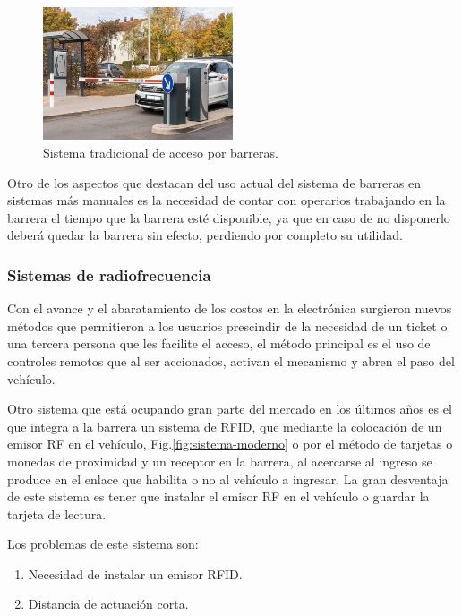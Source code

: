 \begin{figure}
    \centering
    \includegraphics[width=0.5\textwidth]{imgs/sistema-control-acceso-barreras.jpg}
    \caption{Sistema tradicional de acceso por barreras.}
    \label{fig:sistema-tradicional}
\end{figure}

Otro de los aspectos que destacan del uso actual del sistema de barreras en sistemas más manuales es la necesidad de
contar con  operarios trabajando en la barrera el tiempo que la barrera esté disponible, ya que en caso de no disponerlo
deberá quedar la barrera sin efecto, perdiendo por completo su utilidad.

\subsubsection*{Sistemas de radiofrecuencia}

Con el avance y el abaratamiento de los costos en la electrónica surgieron nuevos métodos que permitieron a los usuarios prescindir de la necesidad de un ticket o una tercera persona que les facilite el acceso, el método principal es el uso de controles remotos que al ser accionados, activan el mecanismo y abren el paso del vehículo.

Otro sistema que está ocupando gran parte del mercado en los últimos años es el que integra a la barrera un sistema de RFID, que mediante la colocación de un emisor RF en el vehículo, Fig.\ref{fig:sistema-moderno} o por el método de tarjetas o monedas de proximidad y un receptor en la barrera, al acercarse al ingreso se produce en el enlace que habilita o no al vehículo a ingresar. La gran desventaja de este sistema es tener que instalar el emisor RF en el vehículo o guardar la tarjeta de lectura.

Los problemas de este sistema son:

\begin{enumerate}
    \item Necesidad de instalar un emisor RFID.
    \item Distancia de actuación corta.
\end{enumerate}

